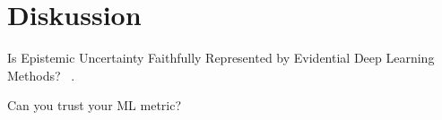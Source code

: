 
\chapter{Diskussion}\label{chapter:diskussion}

Is Epistemic Uncertainty Faithfully Represented by Evidential Deep Learning Methods? ~\parencite{Jurgens.}.

Can you trust your ML metric? ~\parencite{Herd04082024}
